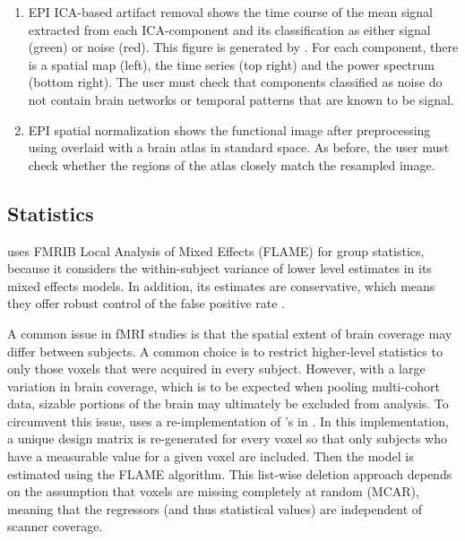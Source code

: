 \begin{enumerate}[leftmargin=*]
\item

EPI ICA-based artifact removal shows the time course of the mean signal
extracted from each ICA-component and its classification as either signal
(green) or noise (red). This figure is generated by . For
each component, there is a spatial map (left), the time series (top right)
and the power spectrum (bottom right). The user must check that components
classified as noise do not contain brain networks or temporal patterns that
are known to be signal.

\item

EPI spatial normalization shows the functional image after preprocessing
using  overlaid with a brain atlas in standard space. As
before, the user must check whether the regions of the atlas closely match
the resampled image.

\end{enumerate}

\subsection{Statistics}\label{sec:statistics}

 uses  FMRIB Local Analysis of Mixed Effects
(FLAME) \parencite{10.1016/j.neuroimage.2003.12.023} for group statistics,
because it considers the within-subject variance of lower level estimates
in its mixed effects models. In addition, its estimates are conservative,
which means they offer robust control of the false positive rate
\parencite{10.1073/pnas.1602413113}.

A common issue in fMRI studies is that the spatial extent of brain coverage
may differ between subjects. A common choice is to restrict higher-level
statistics to only those voxels that were acquired in every subject.
However, with a large variation in brain coverage, which is to be expected
when pooling multi-cohort data, sizable portions of the brain may
ultimately be excluded from analysis. To circumvent this issue,
 uses a re-implementation of 's  in
 \parencite{10.1038/s41586-020-2649-2}. In this implementation, a
unique design matrix is re-generated for every voxel so that only subjects
who have a measurable value for a given voxel are included. Then the model
is estimated using the FLAME algorithm. This list-wise deletion approach
depends on the assumption that voxels are missing completely at random
(MCAR), meaning that the regressors (and thus statistical values) are
independent of scanner coverage.

